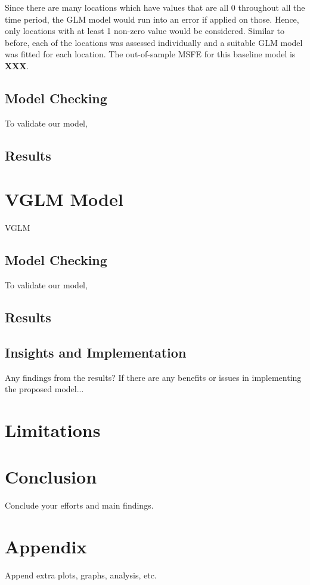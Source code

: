 \documentclass[10pt, letterpaper] {article}
\begin{document}
Since there are many locations which have values that are all 0 throughout all the time period, the GLM model would run into an error if applied on those. Hence, only locations with at least 1 non-zero value would be considered. Similar to before, each of the locations was assessed individually and a suitable GLM model was fitted for each location. The out-of-sample MSFE for this baseline model is \textbf{XXX}. 

\subsection{Model Checking}
To validate our model, 

\subsection{Results}


\section{VGLM Model}
VGLM


\subsection{Model Checking}
To validate our model,

\subsection{Results}

\subsection{Insights and Implementation}
Any findings from the results? If there are any benefits or issues in implementing the proposed model...

\section{Limitations}

\section{Conclusion}
Conclude your efforts and main findings.

\section{Appendix}
Append extra plots, graphs, analysis, etc. 

 

\end{document}

